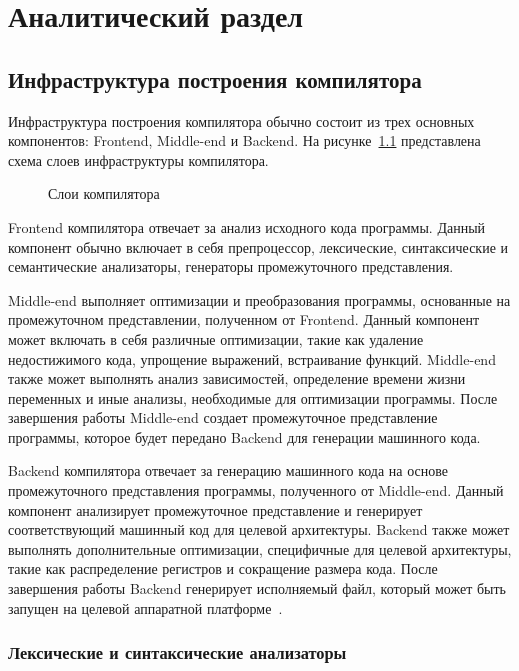 \chapter{Аналитический раздел}

\section{Инфраструктура построения компилятора}

Инфраструктура построения компилятора обычно состоит из трех основных компонентов: Frontend, Middle-end и Backend.
На рисунке~\ref{fig:compiller-layers} представлена схема слоев инфраструктуры компилятора.

\begin{figure}[h]
    \centering

    

    \caption{Слои компилятора}
    \label{fig:compiller-layers}
\end{figure}


Frontend компилятора отвечает за анализ исходного кода программы.
Данный компонент обычно включает в себя препроцессор, лексические, синтаксические и семантические анализаторы, генераторы промежуточного представления.

Middle-end выполняет оптимизации и преобразования программы, основанные на промежуточном представлении, полученном от Frontend.
Данный компонент может включать в себя различные оптимизации, такие как удаление недостижимого кода, упрощение выражений, встраивание функций.
Middle-end также может выполнять анализ зависимостей, определение времени жизни переменных и иные анализы, необходимые для оптимизации программы.
После завершения работы Middle-end создает промежуточное представление программы, которое будет передано Backend для генерации машинного кода.

Backend компилятора отвечает за генерацию машинного кода на основе промежуточного представления программы, полученного от Middle-end.
Данный компонент анализирует промежуточное представление и генерирует соответствующий машинный код для целевой архитектуры.
Backend также может выполнять дополнительные оптимизации, специфичные для целевой архитектуры, такие как распределение регистров и сокращение размера кода.
После завершения работы Backend генерирует исполняемый файл, который может быть запущен на целевой аппаратной платформе~\cite{wilhelm1995compiler}.

\subsection{Лексические и синтаксические анализаторы}

